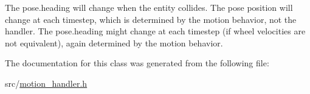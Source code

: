 The pose.\+heading will change when the entity collides. The pose position will change at each timestep, which is determined by the motion behavior, not the handler. The pose.\+heading might change at each timestep (if wheel velocities are not equivalent), again determined by the motion behavior. 

The documentation for this class was generated from the following file\+:\begin{DoxyCompactItemize}
\item 
src/\hyperlink{motion__handler_8h}{motion\+\_\+handler.\+h}\end{DoxyCompactItemize}
